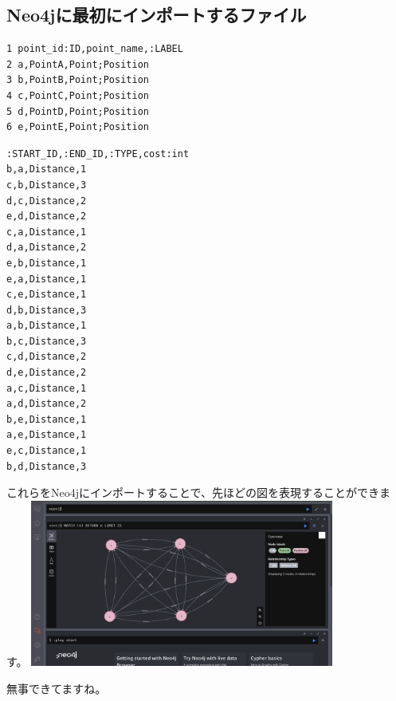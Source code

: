 \subsection{Neo4jに最初にインポートするファイル}

\begin{tcolorbox}[title=point.csv]
    \begin{verbatim}
1 point_id:ID,point_name,:LABEL
2 a,PointA,Point;Position
3 b,PointB,Point;Position
4 c,PointC,Point;Position
5 d,PointD,Point;Position
6 e,PointE,Point;Position
\end{verbatim}
\end{tcolorbox}


\begin{tcolorbox}[title=route.csv]
    \begin{verbatim}
:START_ID,:END_ID,:TYPE,cost:int
b,a,Distance,1
c,b,Distance,3
d,c,Distance,2
e,d,Distance,2
c,a,Distance,1
d,a,Distance,2
e,b,Distance,1
e,a,Distance,1
c,e,Distance,1
d,b,Distance,3
a,b,Distance,1
b,c,Distance,3
c,d,Distance,2
d,e,Distance,2
a,c,Distance,1
a,d,Distance,2
b,e,Distance,1
a,e,Distance,1
e,c,Distance,1
b,d,Distance,3
\end{verbatim}
\end{tcolorbox}
これらをNeo4jにインポートすることで、先ほどの図を表現することができます。
\includegraphics[width=10cm]{./image/03-Tech/chap3/neo4j_result.png}

無事できてますね。

